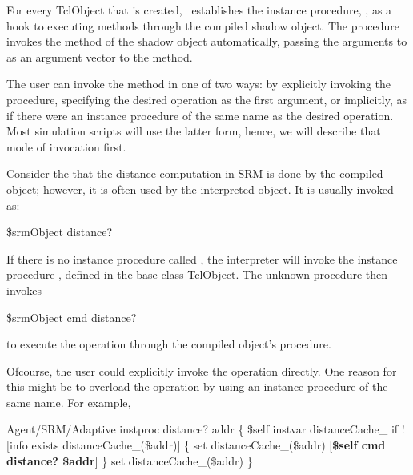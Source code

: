 For every TclObject that is created, \ns\ establishes
the instance procedure, ,
as a hook to executing methods through the compiled shadow object.
The procedure  invokes the method 
of the shadow object automatically, passing the arguments to 
as an argument vector to the  method.

The user can invoke the  method in one of two ways:
by explicitly invoking the procedure, specifying the desired
operation as the first argument, or
implicitly, as if there were an instance procedure of the same name as the
desired operation.
Most simulation scripts will use the latter form, hence, we will
describe that mode of invocation first.

Consider the that the distance computation in SRM is done by
the compiled object; however, it is often used by the interpreted object.
It is usually invoked as:
\begin{program}
        \$srmObject distance? 
\end{program}
If there is no instance procedure called ,
the interpreter will invoke the instance procedure
, defined in the base class TclObject.
The unknown procedure then invokes
\begin{program}
        \$srmObject cmd distance? 
\end{program}
to execute the operation through the compiled object's
 procedure.

Ofcourse, the user could explicitly invoke the operation directly.
One reason for this might be to overload the operation by using
an instance procedure of the same name.
For example,
\begin{program}
        Agent/SRM/Adaptive instproc distance? addr \{
                \$self instvar distanceCache_
                if ![info exists distanceCache_(\$addr)] \{
                        set distanceCache_(\$addr) [{\bfseries{}\$self cmd distance? \$addr}]
                \}
                set distanceCache_(\$addr)
        \}
\end{program}

